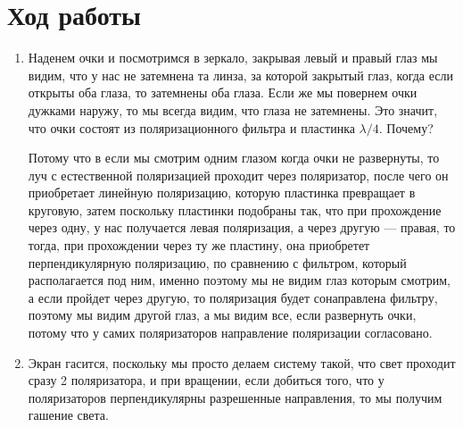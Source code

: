 \documentclass[a4paper, 12pt]{article}%
\begin{document}
\section*{Ход работы}
\begin{enumerate}
\item Наденем очки и посмотримся в зеркало, закрывая левый и правый глаз мы видим, что у нас не затемнена та линза, за которой закрытый глаз, когда если открыты оба глаза, то затемнены оба глаза. Если же мы повернем очки дужками наружу, то мы всегда видим, что глаза не затемнены. Это значит, что очки состоят из поляризационного фильтра и пластинка $\lambda/4$. Почему? 

Потому что в если мы смотрим одним глазом когда очки не развернуты, то луч с естественной поляризацией проходит через поляризатор, после чего он приобретает линейную поляризацию, которую пластинка превращает в круговую, затем поскольку пластинки подобраны так, что при прохождение через одну, у нас получается левая поляризация, а через другую --- правая, то тогда, при прохождении через ту же пластину, она приобретет перпендикулярную поляризацию, по сравнению с фильтром, который располагается под ним, именно поэтому мы не видим глаз которым смотрим, а если пройдет через другую, то поляризация будет сонаправлена фильтру, поэтому мы видим другой глаз, а мы видим все, если развернуть очки, потому что у самих поляризаторов направление поляризации согласовано.

\item Экран гасится, поскольку мы просто делаем систему такой, что свет проходит сразу 2 поляризатора, и при вращении, если добиться того, что у поляризаторов перпендикулярны разрешенные направления, то мы получим гашение света.


\end{enumerate}
\end{document}
